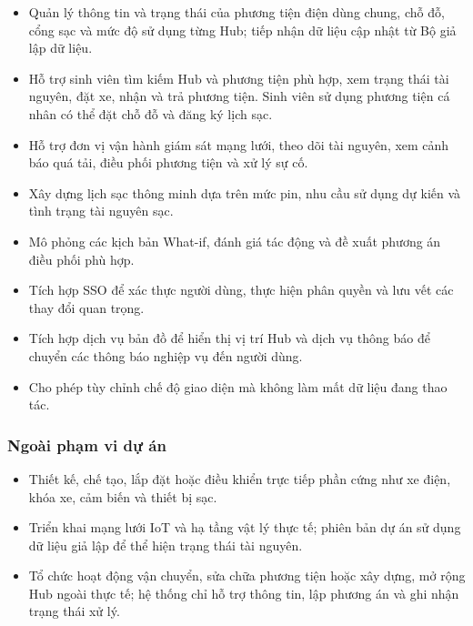 \begin{itemize}

\item Quản lý thông tin và trạng thái của phương tiện điện dùng chung, chỗ đỗ, cổng sạc và mức độ sử dụng từng Hub; tiếp nhận dữ liệu cập nhật từ Bộ giả lập dữ liệu.

\item Hỗ trợ sinh viên tìm kiếm Hub và phương tiện phù hợp, xem trạng thái tài nguyên, đặt xe, nhận và trả phương tiện. Sinh viên sử dụng phương tiện cá nhân có thể đặt chỗ đỗ và đăng ký lịch sạc.

\item Hỗ trợ đơn vị vận hành giám sát mạng lưới, theo dõi tài nguyên, xem cảnh báo quá tải, điều phối phương tiện và xử lý sự cố.

\item Xây dựng lịch sạc thông minh dựa trên mức pin, nhu cầu sử dụng dự kiến và tình trạng tài nguyên sạc.

\item Mô phỏng các kịch bản What-if, đánh giá tác động và đề xuất phương án điều phối phù hợp.

\item Tích hợp SSO để xác thực người dùng, thực hiện phân quyền và lưu vết các thay đổi quan trọng.

\item Tích hợp dịch vụ bản đồ để hiển thị vị trí Hub và dịch vụ thông báo để chuyển các thông báo nghiệp vụ đến người dùng.

\item Cho phép tùy chỉnh chế độ giao diện mà không làm mất dữ liệu đang thao tác.

\end{itemize}

\subsubsection{Ngoài phạm vi dự án}

\begin{itemize}

\item Thiết kế, chế tạo, lắp đặt hoặc điều khiển trực tiếp phần cứng như xe điện, khóa xe, cảm biến và thiết bị sạc.

\item Triển khai mạng lưới IoT và hạ tầng vật lý thực tế; phiên bản dự án sử dụng dữ liệu giả lập để thể hiện trạng thái tài nguyên.

\item Tổ chức hoạt động vận chuyển, sửa chữa phương tiện hoặc xây dựng, mở rộng Hub ngoài thực tế; hệ thống chỉ hỗ trợ thông tin, lập phương án và ghi nhận trạng thái xử lý.

\end{itemize}

